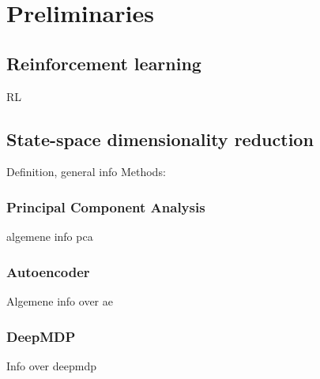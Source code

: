 \chapter{Preliminaries}\label{preliminaries}

\section{Reinforcement learning}\label{pl-rl}
RL

\section{State-space dimensionality reduction}\label{pl-dimensionality}
Definition, general info
Methods:
\subsection{Principal Component Analysis}\label{pl-pca}
algemene info pca
\subsection{Autoencoder}\label{pl-ae}
Algemene info over ae
\subsection{DeepMDP}\label{pl-deepmdp}
Info over deepmdp
